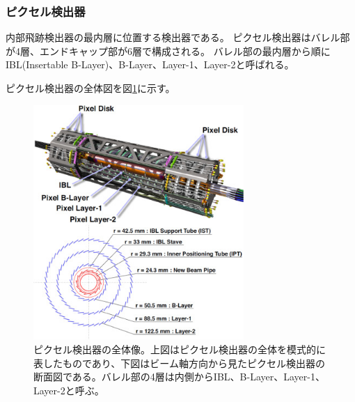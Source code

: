%

\subsubsection{ピクセル検出器}

内部飛跡検出器の最内層に位置する検出器である。
ピクセル検出器はバレル部が4層、エンドキャップ部が6層で構成される。
バレル部の最内層から順にIBL(Insertable B-Layer)、B-Layer、Layer-1、Layer-2と呼ばれる。

ピクセル検出器の全体図を図\ref{pixel_detector_overview}に示す。
\begin{figure}[bpt]\centering
\includegraphics[width=8cm]{./pixel_detector_overview.jpg}
\caption[ピクセル検出器の全体像]{ピクセル検出器の全体像\cite{1-5}。上図はピクセル検出器の全体を模式的に表したものであり、下図はビーム軸方向から見たピクセル検出器の断面図である。バレル部の4層は内側からIBL、B-Layer、Layer-1、Layer-2と呼ぶ。}
\label{pixel_detector_overview}
\end{figure}

